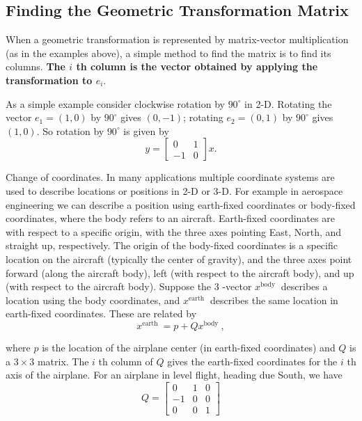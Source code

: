 
\subsection{Finding the Geometric Transformation Matrix}

When a geometric transformation is represented by matrix-vector multiplication (as in the examples above), a simple method to find the matrix is to find its columns. \textbf{The $ i $ th column is the vector obtained by applying the transformation to $ e_{i} . $}

\begin{example}
    As a simple example consider clockwise rotation by $ 90^{\circ} $ in 2-D. Rotating the vector $ e_{1}=(1,0) $ by $ 90^{\circ} $ gives $ (0,-1) $; rotating $ e_{2}=(0,1) $ by $ 90^{\circ} $ gives $ (1,0) $. So rotation by $ 90^{\circ} $ is given by
\begin{equation}
y=\left[\begin{array}{rr}
0 & 1 \\
-1 & 0
\end{array}\right] x .
\end{equation}
\end{example}

\begin{example}
    Change of coordinates. In many applications multiple coordinate systems are used to describe locations or positions in 2-D or 3-D. For example in aerospace engineering we can describe a position using earth-fixed coordinates or body-fixed coordinates, where the body refers to an aircraft. Earth-fixed coordinates are with respect to a specific origin, with the three axes pointing East, North, and straight up, respectively. The origin of the body-fixed coordinates is a specific location on the aircraft (typically the center of gravity), and the three axes point forward (along the aircraft body), left (with respect to the aircraft body), and up (with respect to the aircraft body). Suppose the 3 -vector $ x^{\text {body }} $ describes a location using the body coordinates, and $ x^{\text {earth }} $ describes the same location in earth-fixed coordinates. These are related by
\begin{equation}
x^{\text {earth }}=p+Q x^{\text {body }},
\end{equation}

where $ p $ is the location of the airplane center (in earth-fixed coordinates) and $ Q $ is a $ 3 \times 3 $ matrix. The $ i $ th column of $ Q $ gives the earth-fixed coordinates for the $ i $ th
axis of the airplane. For an airplane in level flight, heading due South, we have
\begin{equation}
Q=\left[\begin{array}{rrr}
0 & 1 & 0 \\
-1 & 0 & 0 \\
0 & 0 & 1
\end{array}\right]
\end{equation}
\end{example}


